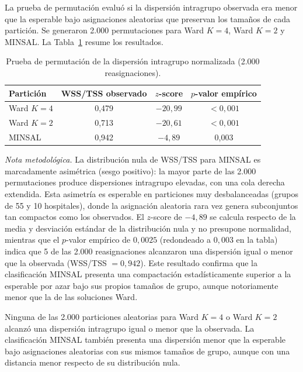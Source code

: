 La prueba de permutación evaluó si la dispersión intragrupo observada era menor
que la esperable bajo asignaciones aleatorias que preservan los tamaños de cada
partición. Se generaron 2.000 permutaciones para Ward $K=4$, Ward $K=2$ y
MINSAL. La Tabla~\ref{tab:permutacion-homogeneidad} resume los resultados.

\begin{table}[htbp]
\centering
\caption{Prueba de permutación de la dispersión intragrupo normalizada (2.000 reasignaciones).}
\label{tab:permutacion-homogeneidad}
\begin{tabular}{l c c c}
\toprule
\textbf{Partición} & \textbf{WSS/TSS observado} &
\textbf{$z$-score} & \textbf{$p$-valor empírico} \\
\midrule
Ward $K=4$ & 0,479 & $-20{,}99$ & $<0{,}001$ \\
Ward $K=2$ & 0,713 & $-20{,}61$ & $<0{,}001$ \\
MINSAL & 0,942 & $-4{,}89$ & 0,003 \\
\bottomrule
\end{tabular}
\par\smallskip
\begin{minipage}{\textwidth}
\normalsize\raggedright
\textit{Nota metodológica.} La distribución nula de WSS/TSS para MINSAL es marcadamente asimétrica (sesgo positivo): la mayor parte de las 2.000 permutaciones produce dispersiones intragrupo elevadas, con una cola derecha extendida. Esta asimetría es esperable en particiones muy desbalanceadas (grupos de 55 y 10 hospitales), donde la asignación aleatoria rara vez genera subconjuntos tan compactos como los observados. El $z$-score de $-4{,}89$ se calcula respecto de la media y desviación estándar de la distribución nula y no presupone normalidad, mientras que el $p$-valor empírico de $0{,}0025$ (redondeado a $0{,}003$ en la tabla) indica que 5 de las 2.000 reasignaciones alcanzaron una dispersión igual o menor que la observada (WSS/TSS $= 0{,}942$). Este resultado confirma que la clasificación MINSAL presenta una compactación estadísticamente superior a la esperable por azar bajo sus propios tamaños de grupo, aunque notoriamente menor que la de las soluciones Ward.
\end{minipage}
\end{table}


Ninguna de las 2.000 particiones aleatorias para Ward $K=4$ o Ward $K=2$
alcanzó una dispersión intragrupo igual o menor que la observada. La
clasificación MINSAL también presenta una dispersión menor que la esperable bajo
asignaciones aleatorias con sus mismos tamaños de grupo, aunque con una
distancia menor respecto de su distribución nula.

